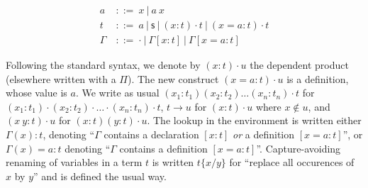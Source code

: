 \documentclass{article}
\newcommand{\sort}{\textsf{s}}
\newcommand{\gor}{\ |\ }
\newcommand{\gdecl}[2]{{#1}\ &::=\ {#2}}
\newcommand{\subst}[2]{\{#1/#2\}}
\begin{document}

\begin{align*}
 \gdecl{a}{x \gor a\ x } \\
 \gdecl{t}{a \gor \sort \gor (x:t)\cdot t \gor (x=a:t)\cdot t} \\
 \gdecl{\Gamma}{\cdot \gor \Gamma[x:t] \gor \Gamma[x=a:t]}
\end{align*}

Following the standard syntax, we denote by $(x:t)\cdot u$ the
dependent product (elsewhere written with a $\Pi$). The new construct
$(x=a:t)\cdot u$ is a definition, whose value is $a$. We write as
usual $(x_1:t_1)(x_2:t_2)\ldots(x_n:t_n)\cdot t$ for
$(x_1:t_1)\cdot(x_2:t_2)\cdot\ldots\cdot(x_n:t_n)\cdot t$, $t \to u$
for $(x:t)\cdot u$ where $x\notin u$, and $(x\ y : t)\cdot u$ for
$(x:t)(y:t)\cdot u$. The lookup in the environment is written either
$\Gamma(x):t$, denoting ``$\Gamma$ contains a declaration $[x:t]$
\emph{or} a definition $[x=a:t]$'', or $\Gamma(x)=a:t$ denoting
``$\Gamma$ contains a definition $[x=a:t]$''. Capture-avoiding
renaming of variables in a term $t$ is written $t\subst{x}{y}$ for
``replace all occurences of $x$ by $y$'' and is defined the usual way.
\end{document}
